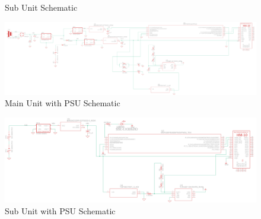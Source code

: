 \begin{landscape}
\begin{center}
\begin{figure}[H]
    \caption{Sub Unit Schematic}
    \label{fig:sub-unit-schematic}
  \end{figure}
  \end{center}
  \begin{center}
  \begin{figure}[H]
    \includegraphics[width=\pdfpagewidth,height=0.65\textheight]{../Main-Unit-and-PSU/Figures/main-unit-and-psu.png}
    \caption{Main Unit with PSU Schematic}
    \label{fig:main-with-psu-schematic}
  \end{figure}
  \end{center}
  \begin{center}
  \begin{figure}[H]
    \includegraphics[width=\pdfpagewidth,height=0.65\textheight]{../Sub-Unit-and-PSU/Figures/sub-unit-and-psu.png}
    \caption{Sub Unit with PSU Schematic}
    \label{fig:sub-with-psu-schematic}
  \end{figure}
  \end{center}
\end{landscape}
